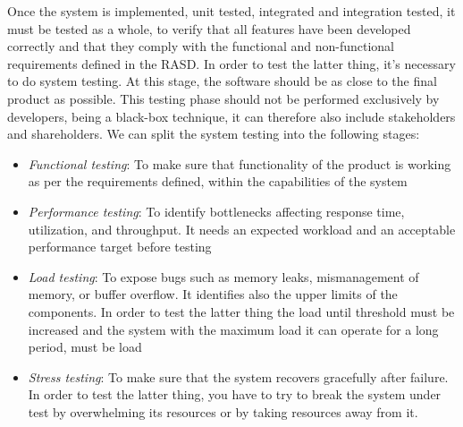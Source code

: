 Once the system is implemented, unit tested, integrated and integration tested, it must be tested as a whole, to verify that all features have been developed correctly and that they comply with the functional and non-functional requirements defined in the RASD. In order to test the latter thing, it's necessary to do system testing. At this stage, the software should be as close to the final product as possible. This testing phase should not be performed exclusively by developers, being a black-box technique, it can therefore also include stakeholders and shareholders. We can split the system testing into the following stages:
\begin{itemize}
    \item \textit{Functional testing}: To make sure that functionality of the product is working as per the requirements defined, within the capabilities of the system
    \item \textit{Performance testing}: To identify bottlenecks affecting response time, utilization, and throughput. It needs an expected workload and an acceptable performance target before testing
    \item \textit{Load testing}: To expose bugs such as memory leaks, mismanagement of memory, or buffer overflow. It identifies also the upper limits of the components. In order to test the latter thing the load until threshold must be increased and the system with the maximum load it can operate for a long period, must be load
    \item \textit{Stress testing}: To make sure that the system recovers gracefully after failure. In order to test the latter thing, you have to try to break the system under test by overwhelming its resources or by taking resources away from it.
\end{itemize}